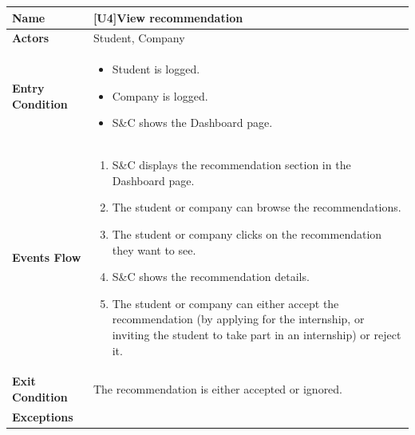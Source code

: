\begin{center}
    \begin{tabular}{|p{9em}|p{27em}|}
        \hline
        \rowcolor{bluepoli!40} %
        \textbf{Name} & \textbf{[U4]View recommendation} \\
        \hline
        \textbf{Actors} & Student, Company \\
        \hline
        \textbf{Entry Condition} & 
        \begin{itemize}
            \item Student is logged.
            \item Company is logged.
            \item S\&C shows the Dashboard page.
        \end{itemize} \\
        \hline
        \textbf{Events Flow} & 
        \begin{enumerate}
            \item S\&C displays the recommendation section in the Dashboard page.
            \item The student or company can browse the recommendations.
            \item The student or company clicks on the recommendation they want to see.
            \item S\&C shows the recommendation details.
            \item The student or company can either accept the recommendation (by applying for the internship, or inviting the 
            student to take part in an internship) or reject it.
        \end{enumerate} \\
        \hline
        \textbf{Exit Condition} & The recommendation is either accepted or ignored. \\
        \hline
        \textbf{Exceptions} & \\
        \hline
    \end{tabular}
\end{center}

